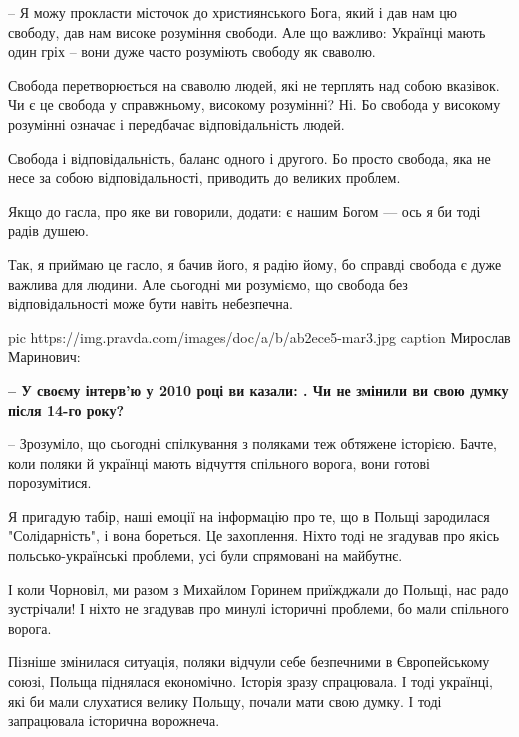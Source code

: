 – Я можу прокласти місточок до християнського Бога, який і дав нам цю свободу,
дав нам високе розуміння свободи. Але що важливо: Українці мають один гріх –
вони дуже часто розуміють свободу як сваволю.

Свобода перетворюється на сваволю людей, які не терплять над собою вказівок. Чи
є це свобода у справжньому, високому розумінні? Ні. Бо свобода у високому
розумінні означає і передбачає відповідальність людей. 

Свобода і відповідальність, баланс одного і другого. Бо просто свобода, яка не
несе за собою відповідальності, приводить до великих проблем.

Якщо до гасла, про яке ви говорили, додати:  є
нашим Богом --- ось я би тоді радів душею. 

Так, я приймаю це гасло, я бачив його, я радію йому, бо справді свобода є дуже
важлива для людини. Але сьогодні ми розуміємо, що свобода без відповідальності
може бути навіть небезпечна.

\ifcmt
pic https://img.pravda.com/images/doc/a/b/ab2ece5-mar3.jpg 
caption Мирослав Маринович: 
\fi

\textbf{– У своєму інтерв’ю у 2010 році ви казали: . Чи не змінили ви свою думку після 14-го року?}

– Зрозуміло, що сьогодні спілкування з поляками теж обтяжене історією. Бачте,
коли поляки й українці мають відчуття спільного ворога, вони готові
порозумітися. 

Я пригадую табір, наші емоції на інформацію про те, що в Польщі зародилася
"Солідарність", і вона бореться. Це захоплення. Ніхто тоді не згадував про
якісь польсько-українські проблеми, усі були спрямовані на майбутнє.

І коли Чорновіл, ми разом з Михайлом Горинем приїжджали до Польщі, нас радо
зустрічали! І ніхто не згадував про минулі історичні проблеми, бо мали
спільного ворога. 

Пізніше змінилася ситуація, поляки відчули себе безпечними в Європейському
союзі, Польща піднялася економічно. Історія зразу спрацювала. І тоді українці,
які би мали слухатися велику Польщу, почали мати свою думку. І тоді запрацювала
історична ворожнеча. 

